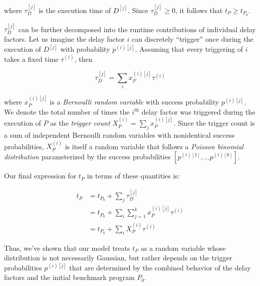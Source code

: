 \documentclass[conference]{IEEEtran}
\begin{document}
where $\tau^{[j]}_D$ is the execution time of $D^{[j]}$. Since $\tau^{[j]}_D \ge 0$, it
follows that $t_P \ge t_{P_0}$.

$\tau^{[j]}_D$ can be further decomposed into the runtime contributions of individual delay
factors. Let us imagine the delay factor $i$ can discretely ``trigger'' once during the
execution of $D^{[j]}$ with probability $p^{(i)[j]}$. Assuming that every triggering of $i$
takes a fixed time $\tau^{(i)}$, then

\begin{equation}
    \tau^{[j]}_D = \sum_{i} x_P^{(i)[j]} \tau^{(i)}
\end{equation}

where $x_P^{(i)[j]}$ is a \textit{Bernoulli random variable} with success probability
$p^{(i)[j]}$. We denote the total number of times the $i^{\textrm{th}}$ delay factor was
triggered during the execution of $P$ as the \textit{trigger count} $X_P^{(i)} = \sum_{j}
x_P^{(i)[j]}$. Since the trigger count is a sum of independent Bernoulli random variables with
nonidentical success probabilities, $X_P^{(i)}$ is itself a random variable that follows a
\textit{Poisson binomial distribution} parameterized by the success probabilities
$\left[p^{(i)[1]}, \dots p^{(i)[k]}\right]$.

Our final expression for $t_P$ in terms of these quantities is:

\begin{align}
t_P &= t_{P_0} + \sum_{j} \tau^{[j]}_D \\ \nonumber
    &= t_{P_0} + \sum_{i} \sum_{j=1}^{k} x_P^{(i)[j]} \tau^{(i)} \\ \nonumber
    &= t_{P_0} + \sum_{i} X_P^{(i)} \tau^{(i)}
\end{align}

Thus, we've shown that our model treats $t_P$ as a random variable whose distribution is not
necessarily Gaussian, but rather depends on the trigger probabilities $p^{(i)[j]}$ that are
determined by the combined behavior of the delay factors and the initial benchmark program
$P_0$.


%
\end{document}

